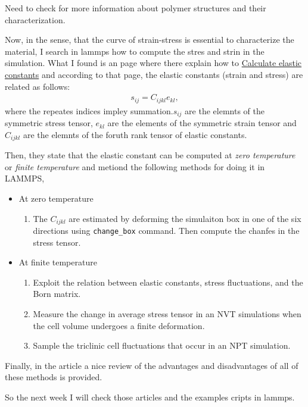 \documentclass[a4paper, 11pt, oneside]{researchjournal} %
\begin{document}
Need to check \cite{dealyStructureRheologyMolten2006} for more information about polymer structures and their characterization.

Now, in the sense, that the curve of strain-stress is essential to characterize the material, I search in lammps how to compute the stres and strin in the simulation.
What I found is an page where there explain how to \href{https://docs.lammps.org/Howto_elastic.html}{Calculate elastic constants} and according to that page, the elastic constants (strain and stress) are related as follows:
\begin{gather*}
	s_{ij} = C_{ijkl} e_{kl},
\end{gather*}
where the repeates indices impley summation.$s_{ij}$ are the elemnts of the symmetric stress tensor, $e_{kl}$ are the elements of the symmetric strain tensor and $C_{ijkl}$ are the elemnts of the foruth rank tensor of elastic constants.

Then, they state that the elastic constant can be computed at \textit{zero temperature} or \textit{finite temperature} and metiond the following methods for doing it in LAMMPS,
\begin{itemize}
	\item At zero temperature
		\begin{enumerate}
			\item The $C_{ijkl}$ are estimated by deforming the simulaiton box in one of the six directions using \verb|change_box| command. Then compute the chanfes in the stress tensor.
		\end{enumerate}
	\item At finite temperature
		\begin{enumerate}
				\item Exploit the relation between elastic constants, stress fluctuations, and the Born matrix. \cite{rayStatisticalEnsemblesMolecular1984}
				\item Measure the change in average stress tensor in an NVT simulations when the cell volume undergoes a finite deformation.
				\item Sample the triclinic cell fluctuations that occur in an NPT simulation. 
			\end{enumerate}
\end{itemize}

Finally, in the article \cite{clavierComputationElasticConstants2017} a nice review of the advantages and disadvantages of all of these methods is provided.

So the next week I will check those articles and the examples cripts in lammps.
\end{document}
